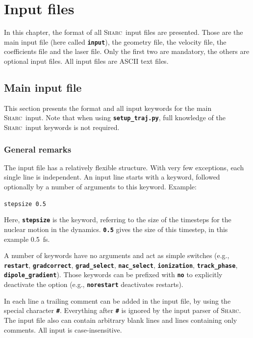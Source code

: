 \documentclass[a4paper,11pt,DIV=15,openany,twoside=false]{scrbook}
\newcommand{\sharc}{\textsc{Sharc}}
\newcommand{\ttt}[1]{\textbf{\texttt{#1}}}
\newenvironment{example}{
  \vspace{0mm}
  \definecolor{shadecolor}{HTML}{E4F4FF}
  \begin{shaded}
}{
  \end{shaded}
}
\begin{document}
\chapter{Input files}\label{chap:input}

In this chapter, the format of all \sharc\ input files are presented. Those are the main input file (here called \ttt{input}), the geometry file, the velocity file, the coefficients file and the laser file. Only the first two are mandatory, the others are optional input files. All input files are ASCII text files.


\section{Main input file}\label{sec:inputfile}

This section presents the format and all input keywords for the main \sharc\ input. Note that when using \ttt{setup\_traj.py}, full knowledge of the \sharc\ input keywords is not required.

\subsection{General remarks}

The input file has a relatively flexible structure. With very few exceptions, each single line is independent. An input line starts with a keyword, followed optionally by a number of arguments to this keyword. Example:

\begin{example}
  \verb|stepsize 0.5|
\end{example}

Here, \ttt{stepsize} is the keyword, referring to the size of the timesteps for the nuclear motion in the dynamics. \ttt{0.5} gives the size of this timestep, in this example 0.5~fs.

A number of keywords have no arguments and act as simple switches (e.g., \ttt{restart}, \ttt{gradcorrect}, \ttt{grad\_select}, \ttt{nac\_select}, \ttt{ionization}, \ttt{track\_phase}, \ttt{dipole\_gradient}). Those keywords can be prefixed with \ttt{no} to explicitly deactivate the option (e.g., \ttt{norestart} deactivates restarts).

In each line a trailing comment can be added in the input file, by using the special character \ttt{\#}. Everything after \ttt{\#} is ignored by the input parser of \sharc. The input file also can contain arbitrary blank lines and lines containing only comments. All input is case-insensitive.
\end{document}
